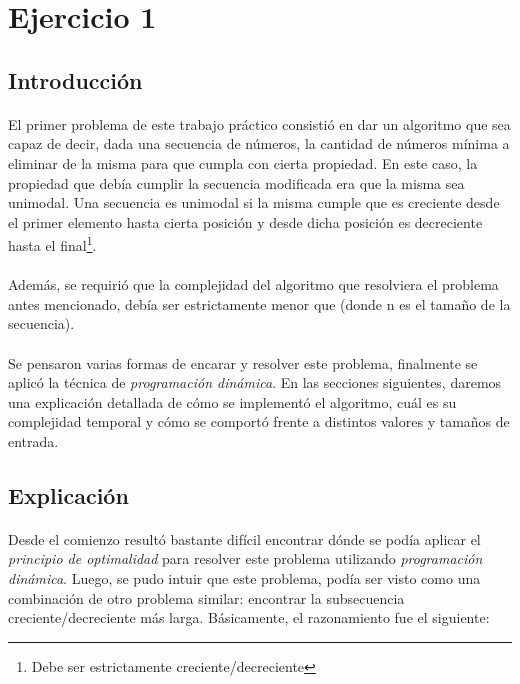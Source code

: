 \section{Ejercicio 1}


\subsection{Introducción}

\paragraph{}
El primer problema de este trabajo práctico consistió en dar un algoritmo que sea capaz de decir, dada una secuencia de números, la cantidad de números mínima a eliminar de la misma para que cumpla con cierta propiedad. En este caso, la propiedad que debía cumplir la secuencia  modificada era que la misma sea unimodal. Una secuencia es unimodal si la misma cumple que es creciente desde el primer elemento hasta cierta posición y desde dicha posición es decreciente hasta el final\footnote{Debe ser estrictamente creciente/decreciente}.

\paragraph{}
Además, se requirió que la complejidad del algoritmo que resolviera el problema antes mencionado, debía ser estrictamente menor que  (donde n es el tamaño de la secuencia).

\paragraph{}
Se pensaron varias formas de encarar y resolver este problema, finalmente se aplicó la técnica de \textit{programación dinámica}. En las secciones siguientes, daremos una explicación detallada de cómo se implementó el algoritmo, cuál es su complejidad temporal y cómo se comportó frente a distintos valores y tamaños de entrada.


\subsection{Explicación}

\paragraph{}
Desde el comienzo resultó bastante difícil encontrar dónde se podía aplicar el \textit{principio de optimalidad} para resolver este problema utilizando \textit{programación dinámica}. Luego, se pudo intuir que este problema, podía ser visto como una combinación de otro problema similar: encontrar la subsecuencia creciente/decreciente más larga. Básicamente, el razonamiento fue el siguiente:\\

